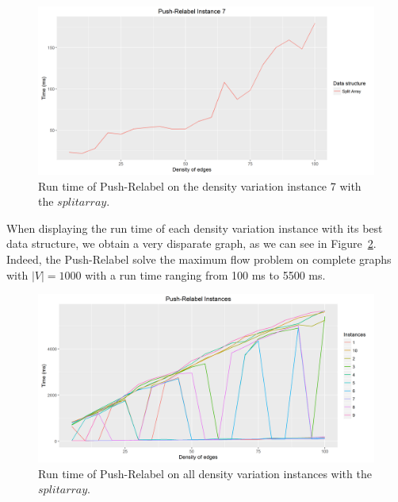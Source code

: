 \begin{figure}[H]
\begin{center}
\includegraphics[scale=0.5]{images/pri7.png}
\caption{Run time of Push-Relabel on the density variation instance 7 with the $split array$.}
\label{fig:PR7}
\end{center}
\end{figure}
When displaying the run time of each density variation instance with its best data structure, we obtain a very disparate graph, as we can see in Figure~\ref{fig:PRmean}. Indeed, the Push-Relabel solve the maximum flow problem on complete graphs with $|V|=1000$ with a run time ranging from 100 ms to 5500 ms.
\begin{figure}[H]
\begin{center}
\includegraphics[scale=0.5]{images/PRmean.png}
\caption{Run time of Push-Relabel on all density variation instances with the $split array$.}
\label{fig:PRmean}
\end{center}
\end{figure}
